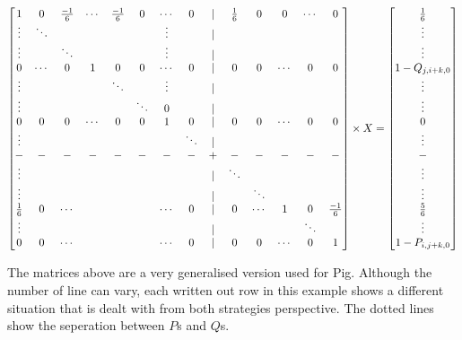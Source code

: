 \documentclass[a4paper,titlepage]{article}
\begin{document}
\begin{align*}
	\setcounter{MaxMatrixCols}{40}
	\begin{bmatrix}
		1&0&\frac{-1}{6}&\cdots&\frac{-1}{6}&0&\cdots&0&|&\frac{1}{6}&0&0&\cdots&0\\
		\vdots& \ddots &&&&&\vdots&&			|&&&&&\\
		\vdots&& \ddots &&&&\vdots&&			|&&&&&\\
		0 & \cdots & 0 & 1 & 0 & 0 &\cdots&0&   |&0&0&\cdots&0&0\\
		\vdots&&&&\ddots&&\vdots&&				|&&&&&\\
		\vdots&&&&&\ddots&0&&					|&&&&&\\
		0&0&0&\cdots&0&0&1&0&					|&0&0&\cdots&0&0\\
		\vdots&&&&&&&\ddots&					|&&&&&\\
		-&-&-&-&-&-&-&-&    					+&-&-&-&-&-\\
		\vdots& & & & & & & &    				|&\ddots& & & &\\
		\vdots& & & & & & & &    				|&&\ddots&&&\\
		\frac{1}{6}&0&\cdots&&&&\cdots&0&		|&0&\cdots& 1 & 0 & \frac{-1}{6}\\
		\vdots& & & & & & & &    				|&&&&\ddots\\
		0&0&\cdots& & & &\cdots&0&   			|&0&0&\cdots&0&1\\
	\end{bmatrix}
	\times X =
	\begin{bmatrix}
		\frac{1}{6}\\
		\vdots\\
		\vdots\\
		1-Q_{j,i+k,0}\\
		\vdots\\
		\vdots\\
		0\\
		\vdots\\
		-\\
		\vdots\\
		\vdots\\
		\frac{5}{6}\\
		\vdots\\
		1-P_{i,j+k,0}\\
	\end{bmatrix}
\end{align*}

The matrices above are a very generalised version used for Pig. Although the number of line can vary, each written out row in this example shows a different situation that is dealt with from both strategies perspective. The dotted lines show the seperation between $P$s and $Q$s.
\end{document}
